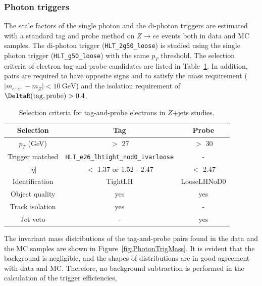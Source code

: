 \subsubsection{Photon triggers}
\label{subsect:photonTrigEff}

The scale factors of the single photon and the di-photon triggers are estimated with a standard tag and probe method on $Z\rightarrow ee$ events both in data and MC samples. The di-photon trigger (\texttt{HLT\_2g50\_loose}) is studied using the single photon trigger (\texttt{HLT\_g50\_loose}) with the same $p_{T}$ threshold. The selection criteria of electron tag-and-probe candidates are listed in Table~\ref{tab:ZeeSelection}. In addition, pairs are required to have opposite signs and to satisfy the mass requirement ($|m_{e^{+}e^{-}} - m_{Z}| < 10~\si{\GeV}$) and the isolation requirement of $\DeltaR(\mathrm{tag}, \mathrm{probe}) > 0.4$. 

\begin{table}[!htb]
	\centering
	\begin{tabular}{ccc}
		\hline
		\hline
		Selection               & Tag                                           & Probe         \\
		\hline
		$p_{T}$ (GeV)           & $>$ 27                                        & $>$ 30        \\
		Trigger matched         & \texttt{HLT\_e26\_lhtight\_nod0\_ivarloose}   & -             \\
		$|\eta|$                & $<$ 1.37 or 1.52 - 2.47                       & $<$ 2.47      \\
		Identification          & TightLH                                       & LooseLHNoD0   \\
		Object quality          & yes                                           & yes           \\
		Track isolation         & yes                                           & -             \\
		Jet veto                & -                                             & yes           \\
		\hline
		\hline
	\end{tabular}
	\caption{Selection criteria for tag-and-probe electrons in $Z$+jets studies.}
	\label{tab:ZeeSelection}
\end{table}

The invariant mass distributions of the tag-and-probe pairs found in the data and the MC samples are shown in Figure~\ref{fig:PhotonTrigMass}. It is evident that the background is negligible, and the shapes of distributions are in good agreement with data and MC. Therefore, no background subtraction is performed in the calculation of the trigger efficiencies, 

